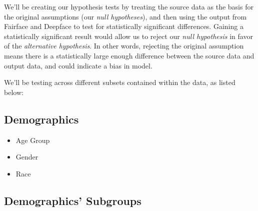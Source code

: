 \documentclass[
  letterpaper,
  DIV=11,
  numbers=noendperiod]{scrreprt}
\providecommand{\tightlist}{%
  \setlength{\itemsep}{0pt}\setlength{\parskip}{0pt}}\usepackage{longtable,booktabs,array}
\begin{document}
We'll be creating our hypothesis tests by treating the source data as
the basis for the original assumptions (our \emph{null hypotheses}), and
then using the output from Fairface and Deepface to test for
statistically significant differences. Gaining a statistically
significant result would allow us to reject our \emph{null hypothesis}
in favor of the \emph{alternative hypothesis}. In other words, rejecting
the original assumption means there is a statistically large enough
difference between the source data and output data, and could indicate a
bias in model.

We'll be testing across different subsets contained within the data, as
listed below:

\hypertarget{demographics}{%
\subsection{Demographics}\label{demographics}}

\begin{itemize}
\tightlist
\item
  Age Group
\item
  Gender
\item
  Race
\end{itemize}

\hypertarget{demographics-subgroups}{%
\subsection{Demographics' Subgroups}\label{demographics-subgroups}}
\end{document}

